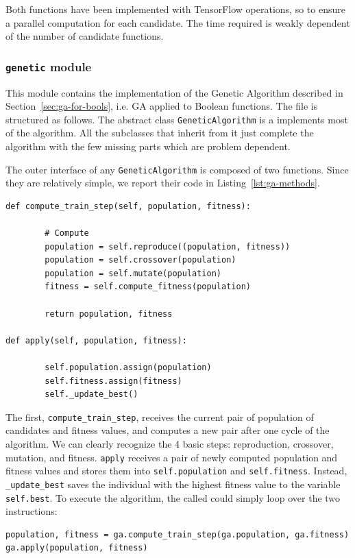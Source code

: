 Both functions have been implemented with TensorFlow operations, so to
ensure a parallel computation for each candidate. The time required is weakly
dependent of the number of candidate functions.


\subsubsection*{\texttt{genetic} module}

This module contains the implementation of the Genetic Algorithm described in
Section~\ref{sec:ga-for-bools}, i.e. GA applied to Boolean functions. The file
is structured as follows. The abstract class \texttt{GeneticAlgorithm} is a
implements most of the algorithm. All the subclasses that inherit from it
just complete the algorithm with the few missing parts which are problem
dependent.

The outer interface of any \texttt{GeneticAlgorithm} is composed of two
functions. Since they are relatively simple, we report their code in
Listing~\ref{lst:ga-methods}.
\begin{lstlisting}[style=floatpy, label=lst:ga-methods,
	caption={The public interface of any \texttt{GeneticAlgorithm}.}]
def compute_train_step(self, population, fitness):

		# Compute
		population = self.reproduce((population, fitness))
		population = self.crossover(population)
		population = self.mutate(population)
		fitness = self.compute_fitness(population)

		return population, fitness

def apply(self, population, fitness):

		self.population.assign(population)
		self.fitness.assign(fitness)
		self._update_best()
\end{lstlisting}
The first, \verb|compute_train_step|, receives the current pair of population
of candidates and fitness values, and computes a new pair after one cycle of
the algorithm. We can clearly recognize the 4 basic steps: reproduction,
crossover, mutation, and fitness. \verb|apply| receives a pair of newly
computed population and fitness values and stores them into
\verb|self.population| and \verb|self.fitness|. Instead, \verb|_update_best|
saves the individual with the highest fitness value to the variable
\verb|self.best|. To execute the algorithm, the called could simply loop
over the two instructions:
\begin{lstlisting}[style=python]
population, fitness = ga.compute_train_step(ga.population, ga.fitness)
ga.apply(population, fitness)
\end{lstlisting}


